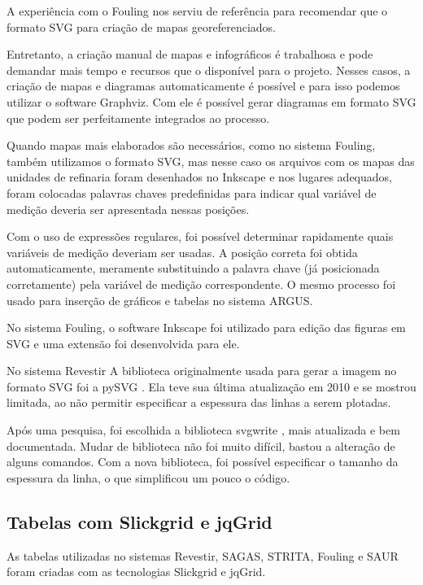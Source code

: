 \documentclass[]{article}
\begin{document}
A experiência com o Fouling nos serviu de referência para recomendar que o formato SVG para criação de mapas georeferenciados.

Entretanto, a criação manual de mapas e infográficos é trabalhosa e pode demandar mais tempo e recursos que o disponível para o projeto. Nesses casos, a criação de mapas e diagramas automaticamente é possível e para isso podemos utilizar o software Graphviz. \cite{graphviz:Online} Com ele é possível gerar diagramas em formato SVG que podem ser perfeitamente integrados ao processo. 

Quando mapas mais elaborados são necessários, como no sistema Fouling, também utilizamos o formato SVG, mas nesse caso os arquivos com os mapas das unidades de refinaria foram desenhados no Inkscape e nos lugares adequados, foram colocadas palavras chaves predefinidas para indicar qual variável de medição deveria ser apresentada nessas posições.

Com o uso de expressões regulares, foi possível determinar rapidamente quais variáveis de medição deveriam ser usadas. A posição correta foi obtida automaticamente, meramente substituindo a palavra chave (já posicionada corretamente) pela variável de medição correspondente. O mesmo processo foi usado para inserção de gráficos e tabelas no sistema ARGUS.

No sistema Fouling, o software Inkscape foi utilizado para edição das figuras em SVG e uma extensão foi desenvolvida para ele. 

No sistema Revestir A biblioteca originalmente usada para gerar a imagem no formato SVG foi a pySVG \cite{pysvg:Online}. Ela teve sua última atualização em 2010 e se mostrou limitada, ao não permitir especificar a espessura das linhas a serem plotadas. 

Após uma pesquisa, foi escolhida a biblioteca svgwrite \cite{svgwrite:Online}, mais atualizada e bem documentada. Mudar de biblioteca não foi muito difícil, bastou a alteração de alguns comandos. Com a nova biblioteca, foi possível especificar o tamanho da espessura da linha, o que simplificou um pouco o código.  


\subsection{Tabelas com Slickgrid e jqGrid}

As tabelas utilizadas no sistemas Revestir, SAGAS, STRITA, Fouling e SAUR foram criadas com as tecnologias Slickgrid e jqGrid. \cite{SlickGrid:Online} \cite{jqGrid:Online}
\end{document}
